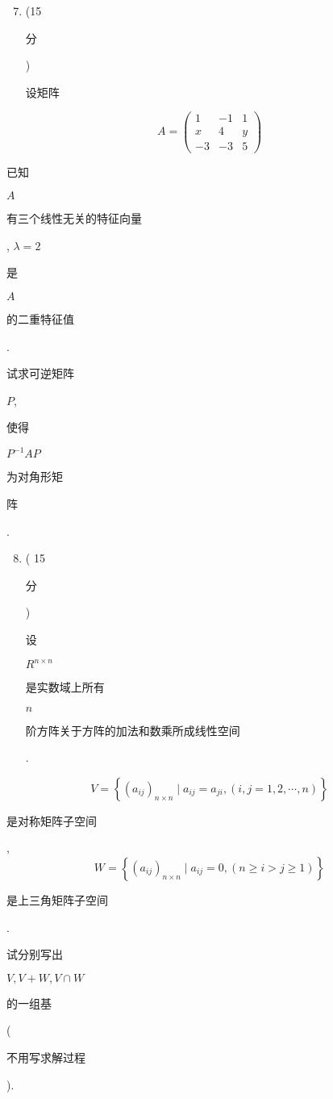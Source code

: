 \documentclass[10pt]{article}
\begin{document}
\begin{enumerate}
  \setcounter{enumi}{6}
  \item (15 \begin{CJK}{UTF8}{mj}分\end{CJK}) \begin{CJK}{UTF8}{mj}设矩阵\end{CJK}
\end{enumerate}
$$
A=\left(\begin{array}{ccc}
1 & -1 & 1 \\
x & 4 & y \\
-3 & -3 & 5
\end{array}\right)
$$
\begin{CJK}{UTF8}{mj}已知\end{CJK} $A$ \begin{CJK}{UTF8}{mj}有三个线性无关的特征向量\end{CJK}, $\lambda=2$ \begin{CJK}{UTF8}{mj}是\end{CJK} $A$ \begin{CJK}{UTF8}{mj}的二重特征值\end{CJK}. \begin{CJK}{UTF8}{mj}试求可逆矩阵\end{CJK} $P$, \begin{CJK}{UTF8}{mj}使得\end{CJK} $P^{-1} A P$ \begin{CJK}{UTF8}{mj}为对角形矩\end{CJK} \begin{CJK}{UTF8}{mj}阵\end{CJK}.

\begin{enumerate}
  \setcounter{enumi}{7}
  \item ( 15 \begin{CJK}{UTF8}{mj}分\end{CJK}) \begin{CJK}{UTF8}{mj}设\end{CJK} $R^{n \times n}$ \begin{CJK}{UTF8}{mj}是实数域上所有\end{CJK} $n$ \begin{CJK}{UTF8}{mj}阶方阵关于方阵的加法和数乘所成线性空间\end{CJK}.
\end{enumerate}
$$
V=\left\{\left(a_{i j}\right)_{n \times n} \mid a_{i j}=a_{j i},(i, j=1,2, \cdots, n)\right\}
$$
\begin{CJK}{UTF8}{mj}是对称矩阵子空间\end{CJK},
$$
W=\left\{\left(a_{i j}\right)_{n \times n} \mid a_{i j}=0,(n \geqslant i>j \geqslant 1)\right\}
$$
\begin{CJK}{UTF8}{mj}是上三角矩阵子空间\end{CJK}. \begin{CJK}{UTF8}{mj}试分别写出\end{CJK} $V, V+W, V \cap W$ \begin{CJK}{UTF8}{mj}的一组基\end{CJK} (\begin{CJK}{UTF8}{mj}不用写求解过程\end{CJK}).
\end{document}
